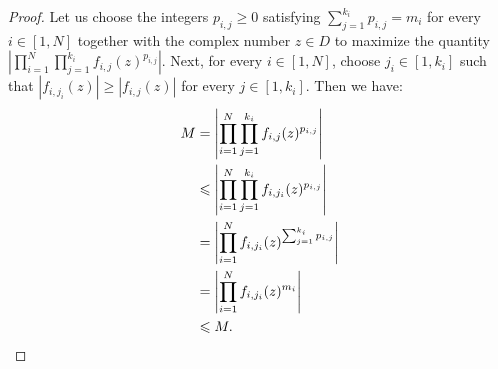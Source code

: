 \documentclass[runningheads,orivec]{llncs}
\let\leq=\leqslant
\let\geq=\geqslant
\begin{document}
    \begin{proof}
        Let us choose the integers $p_{i,j}\geq 0$ satisfying $\sum_{j=1}^{k_i}p_{i,j}=m_i$ for every $i\in[1,N]$ together with the complex number $z\in D$ to maximize the quantity $\left|\prod_{i=1}^N\prod_{j=1}^{k_i}f_{i,j}(z)^{p_{i,j}}\right|$. Next, for every $i\in[1,N]$, choose $j_i\in[1,k_i]$ such that $|f_{i,j_i}(z)|\geq|f_{i,j}(z)|$ for every $j\in[1,k_i]$. Then we have:
        \begin{align*}
            M&=\left|\prod_{i=1}^N\prod_{j=1}^{k_i}f_{i,j}(z)^{p_{i,j}}\right|\\
    		&\leq\left|\prod_{i=1}^N\prod_{j=1}^{k_i}f_{i,j_i}(z)^{p_{i,j}}\right|\\
    		&=\left|\prod_{i=1}^Nf_{i,j_i}(z)^{\sum_{j=1}^{k_i}p_{i,j}}\right|\\
    		&=\left|\prod_{i=1}^Nf_{i,j_i}(z)^{m_i}\right|\\
    		&\leq M.\qedhere
        \end{align*}
    \end{proof}
    
\end{document}
